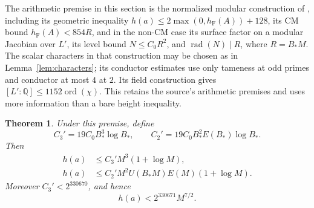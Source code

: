 \documentclass[11pt,a4paper]{article}
\newtheorem{theorem}{Theorem}[section]
\theoremstyle{definition}\newtheorem{remark}[theorem]{Remark}
\newcommand{\Q}{\mathbb Q}\newcommand{\Z}{\mathbb Z}
\newcommand{\hF}{h_{\mathrm F}}
\newcommand{\ord}{\operatorname{ord}}
\newcommand{\rad}{\operatorname{rad}}
\begin{document}
The arithmetic premise in this section is the normalized modular
construction of \cite[proof of \texttt{o8-height}]{Source}, including
its geometric inequality $h(a)\le2\max(0,\hF(A))+128$, its CM bound
$\hF(A)<854R$, and in the non-CM case its surface factor on a modular
Jacobian over $L'$, its level bound $N\le C_0R^2$, and
$\rad(N)\mid R$, where $R=B_*M$. The scalar characters in that
construction may be chosen as in Lemma~\ref{lem:characters}; its
conductor estimates use only tameness at odd primes and conductor at
most $4$ at $2$. Its field construction gives
$[L':\Q]\le1152\ord(\chi)$. This retains the source's arithmetic
premises and uses more information than a bare height inequality.

\begin{theorem}\label{thm:refined}
Under this premise, define
\[
 C_3'=19C_0B_*^3\log B_* ,\qquad
 C_2'=19C_0B_*^2E(B_*)\log B_* .
\]
Then
\begin{align}
 h(a)&\le C_3'M^3(1+\log M),\label{eq:uniform}\\
 h(a)&\le C_2'M^2 U(B_*M)E(M)(1+\log M).\label{eq:finer}
\end{align}
Moreover $C_3'<2^{330670}$, and hence
\[
                     h(a)<2^{330671}M^{7/2}.
\]
\end{theorem}
\end{document}
